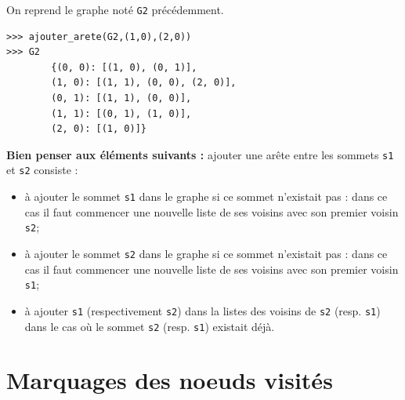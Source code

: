 \documentclass[t,11pt,eleve]{article}
\begin{document}
\begin{exemple}
On reprend le graphe noté \texttt{G2} précédemment. 
\begin{lstlisting}
>>> ajouter_arete(G2,(1,0),(2,0))
>>> G2
        {(0, 0): [(1, 0), (0, 1)],
        (1, 0): [(1, 1), (0, 0), (2, 0)],
        (0, 1): [(1, 1), (0, 0)],
        (1, 1): [(0, 1), (1, 0)],
        (2, 0): [(1, 0)]}
\end{lstlisting}
\end{exemple}


\textbf{Bien penser aux éléments suivants :} ajouter une arête entre les sommets \texttt{s1} et \texttt{s2} consiste :
\begin{itemize}
\item à ajouter le sommet \texttt{s1} dans le graphe si ce sommet n'existait pas : dans ce cas il faut commencer une nouvelle liste de ses voisins avec son premier voisin \texttt{s2};
\item à ajouter le sommet \texttt{s2} dans le graphe si ce sommet n'existait pas : dans ce cas il faut commencer une nouvelle liste de ses voisins avec son premier voisin \texttt{s1};
\item à ajouter \texttt{s1} (respectivement \texttt{s2}) dans la listes des voisins de \texttt{s2} (resp. \texttt{s1}) dans le cas où le sommet \texttt{s2} (resp. \texttt{s1}) existait déjà.
\end{itemize}


\section{Marquages des noeuds visités}
\end{document}
